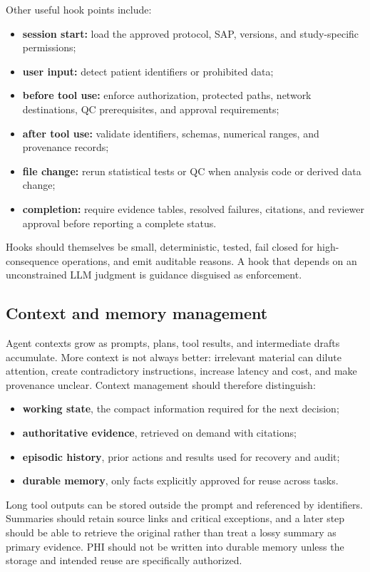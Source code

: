\documentclass[12pt,oneside]{book}
\numberwithin{equation}{section}
\theoremstyle{definition}
\theoremstyle{plain}
\theoremstyle{remark}
\begin{document}
Other useful hook points include:
\begin{itemize}
    \item \textbf{session start:} load the approved protocol, SAP, versions, and
    study-specific permissions;
    \item \textbf{user input:} detect patient identifiers or prohibited data;
    \item \textbf{before tool use:} enforce authorization, protected paths,
    network destinations, QC prerequisites, and approval requirements;
    \item \textbf{after tool use:} validate identifiers, schemas, numerical
    ranges, and provenance records;
    \item \textbf{file change:} rerun statistical tests or QC when analysis code
    or derived data change;
    \item \textbf{completion:} require evidence tables, resolved failures,
    citations, and reviewer approval before reporting a complete status.
\end{itemize}
Hooks should themselves be small, deterministic, tested, fail closed for
high-consequence operations, and emit auditable reasons.  A hook that depends on
an unconstrained LLM judgment is guidance disguised as enforcement.

\subsection{Context and memory management}

Agent contexts grow as prompts, plans, tool results, and intermediate drafts
accumulate.  More context is not always better: irrelevant material can dilute
attention, create contradictory instructions, increase latency and cost, and
make provenance unclear.  Context management should therefore distinguish:
\begin{itemize}
    \item \textbf{working state}, the compact information required for the next
    decision;
    \item \textbf{authoritative evidence}, retrieved on demand with citations;
    \item \textbf{episodic history}, prior actions and results used for recovery
    and audit;
    \item \textbf{durable memory}, only facts explicitly approved for reuse
    across tasks.
\end{itemize}
Long tool outputs can be stored outside the prompt and referenced by identifiers.
Summaries should retain source links and critical exceptions, and a later step
should be able to retrieve the original rather than treat a lossy summary as
primary evidence.  PHI should not be written into durable memory unless the
storage and intended reuse are specifically authorized.
\end{document}
